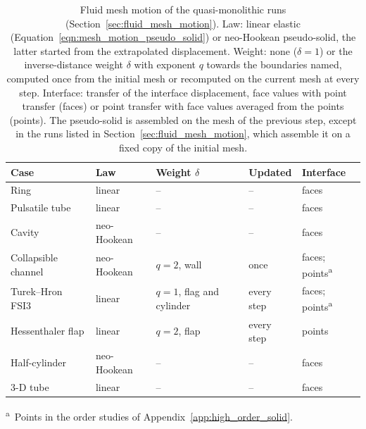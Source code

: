 \begin{table}[htbp]
	\centering
	\footnotesize
	\setlength{\tabcolsep}{4pt}
	\caption{Fluid mesh motion of the quasi-monolithic runs (Section~\ref{sec:fluid_mesh_motion}).
	Law: linear elastic (Equation~\eqref{eqn:mesh_motion_pseudo_solid}) or neo-Hookean pseudo-solid, the latter started from the extrapolated displacement.
	Weight: none ($\delta = 1$) or the inverse-distance weight $\delta$ with exponent $q$ towards the boundaries named, computed once from the initial mesh or recomputed on the current mesh at every step.
	Interface: transfer of the interface displacement, face values with point transfer (faces) or point transfer with face values averaged from the points (points).
	The pseudo-solid is assembled on the mesh of the previous step, except in the runs listed in Section~\ref{sec:fluid_mesh_motion}, which assemble it on a fixed copy of the initial mesh.}
	\label{tab:mesh_motion_settings}
	\begin{tabular}{lllll}
		\toprule
		Case & Law & Weight $\delta$ & Updated & Interface \\
		\midrule
		Ring & linear & -- & -- & faces \\
		Pulsatile tube & linear & -- & -- & faces \\
		Cavity & neo-Hookean & -- & -- & faces \\
		Collapsible channel & neo-Hookean & $q = 2$, wall & once & faces; points\textsuperscript{a} \\
		Turek--Hron FSI3 & linear & $q = 1$, flag and cylinder & every step & faces; points\textsuperscript{a} \\
		Hessenthaler flap & linear & $q = 2$, flap & every step & points \\
		Half-cylinder & neo-Hookean & -- & -- & faces \\
		3-D tube & linear & -- & -- & faces \\
		\bottomrule
	\end{tabular}
	\par\smallskip
	\parbox{0.8\linewidth}{\footnotesize
	\textsuperscript{a}~Points in the order studies of Appendix~\ref{app:high_order_solid}.}
\end{table}
